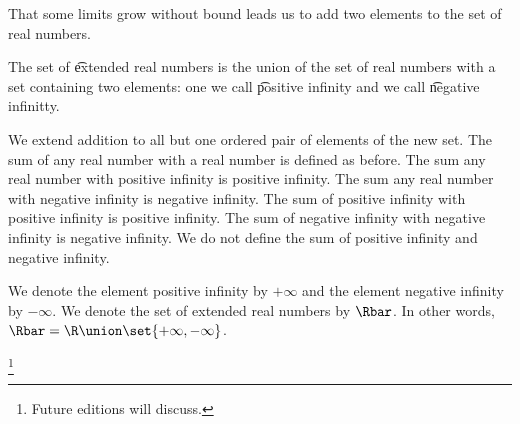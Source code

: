

That some limits grow without bound leads us to add two elements to the set of real numbers.


The set of
\t{extended real numbers}
is the union of
the set of real numbers
with a set containing
two elements:
one we call
\t{positive infinity}
and we call
\t{negative infinitty}.


We extend addition to all
but one ordered pair of elements
of the new set.
The sum of any real number with
a real number is defined as before.
The sum any real number with positive
infinity is positive infinity.
The sum any real number with negative
infinity is negative infinity.
The sum of positive infinity with
positive infinity is positive infinity.
The sum of negative infinity with
negative infinity is negative infinity.
We do not define the sum of
positive infinity and negative infinity.



We denote the element positive infinity by $+\infty$ and the element negative infinity by $-\infty$.
We denote the set of extended real numbers by $\Rbar$.
In other words, $\Rbar = \R \union \set{+\infty,-\infty}$.

\footnote{Future editions will discuss.}

